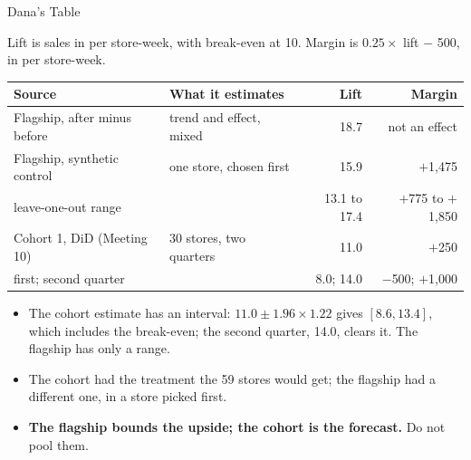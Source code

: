 \documentclass[aspectratio=169, 11pt, handout]{beamer}
\begin{document}
\begin{frame}{Dana's Table}

Lift is sales in  per store-week, with break-even at 10. Margin is $0.25 \times$ lift $-$ 500, in \textyen{} per store-week.

\begin{center}
\small
\begin{tabular}{llrr}
\toprule
\textbf{Source} & \textbf{What it estimates} & \textbf{Lift} & \textbf{Margin} \\
\midrule
Flagship, after minus before & trend and effect, mixed & 18.7 & \textcolor{warnred}{not an effect} \\
Flagship, synthetic control & one store, chosen first & 15.9 & $+$1{,}475 \\
\quad leave-one-out range & & 13.1 to 17.4 & $+$775 to $+$1{,}850 \\
Cohort 1, DiD (Meeting 10) & 30 stores, two quarters & 11.0 & $+$250 \\
\quad first; second quarter & & 8.0; 14.0 & $-$500; $+$1{,}000 \\
\bottomrule
\end{tabular}
\end{center}

\begin{itemize}
  \item The cohort estimate has an interval: $11.0 \pm 1.96 \times 1.22$ gives $[8.6, 13.4]$, which includes the break-even; the second quarter, 14.0, clears it. The flagship has only a range.
  \item The cohort had the treatment the 59 stores would get; the flagship had a different one, in a store picked first.
  \item \textbf{The flagship bounds the upside; the cohort is the forecast.} Do not pool them.
\end{itemize}
\end{frame}
\end{document}
